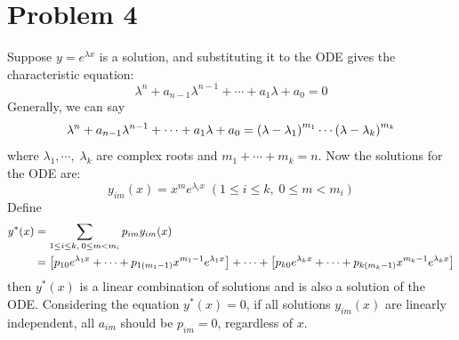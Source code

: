 \documentclass[10pt]{article}
\begin{document}
\section*{Problem 4}
Suppose $y = e^{\lambda x}$ is a solution, and substituting it to the ODE gives the characteristic equation: 
$$\lambda^n + a_{n-1}\lambda^{n-1} + \cdots + a_1\lambda + a_0 = 0$$
Generally, we can say 
$$\lambda^n + a_{n-1}\lambda^{n-1} + \cdots + a_1\lambda + a_0 = \qty(\lambda - \lambda_1)^{m_1}\cdots\qty(\lambda - \lambda_k)^{m_k}$$
where $\lambda_1, \cdots, \; \lambda_k$ are complex roots and $m_1 + \cdots + m_k = n$. Now the solutions for the ODE are:
$$y_{im}(x) = x^me^{\lambda_ix} \; (1 \leq i\leq k, \; 0 \leq m < m_i)$$
Define 
\begin{align*}
    y^{*}(x) &= \sum_{1 \leq i\leq k, \; 0 \leq m < m_i}p_{im}y_{im}(x) \\
    &= \qty[p_{10}e^{\lambda_1x} + \cdots + p_{1(m_1-1)}x^{m_1-1}e^{\lambda_1x}] + \cdots + \qty[p_{k0}e^{\lambda_kx} + \cdots + p_{k(m_k-1)}x^{m_k-1}e^{\lambda_kx}]
\end{align*}
then $y^{*}(x)$ is a linear combination of solutions and is also a solution of the ODE.
Considering the equation $y^{*}(x) = 0$, if all solutions $y_{im}(x)$ are linearly independent, all $a_{im}$ should be $p_{im} = 0$, regardless of $x$.
\end{document}
